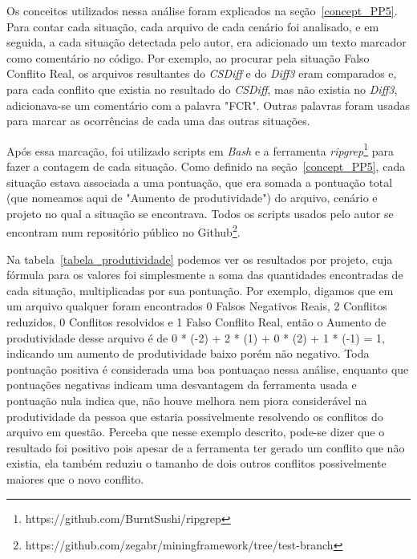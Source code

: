 Os conceitos utilizados nessa análise foram explicados na seção~\ref{concept_PP5}. Para contar cada situação, cada arquivo de cada
cenário foi analisado, e em seguida, a cada situação detectada pelo autor, era adicionado um texto marcador como comentário
no código. Por exemplo, ao procurar pela situação Falso Conflito Real, os arquivos resultantes do \emph{CSDiff} e do \emph{Diff3} eram comparados
e, para cada conflito que existia no resultado do \emph{CSDiff}, mas não existia no \emph{Diff3}, adicionava-se um comentário com a palavra "FCR".
Outras palavras foram usadas para marcar as ocorrências de cada uma das outras situações.

Após essa marcação, foi utilizado scripts em \emph{Bash} e a ferramenta \emph{ripgrep}\footnote{https://github.com/BurntSushi/ripgrep}
para fazer a contagem de cada situação. Como definido
na seção~\ref{concept_PP5}, cada situação estava associada a uma pontuação, que era somada
a pontuação total (que nomeamos aqui de "Aumento de produtividade") do arquivo, cenário e projeto no qual a situação
se encontrava. Todos os scripts usados pelo autor se encontram num repositório público no Github\footnote{https://github.com/zegabr/miningframework/tree/test-branch}. %

Na tabela~\ref{tabela_produtividade} podemos ver os resultados por projeto, cuja fórmula para os valores foi simplesmente a soma
das quantidades encontradas de cada situação, multiplicadas por sua pontuação. Por exemplo, digamos que em um arquivo qualquer
foram encontrados 0 Falsos Negativos Reais, 2 Conflitos reduzidos, 0 Conflitos resolvidos e 1 Falso Conflito Real, então o
Aumento de produtividade desse arquivo é de 0 * (-2) + 2 * (1) + 0 * (2) + 1 * (-1) = 1, indicando um aumento de
produtividade baixo porém não negativo. Toda pontuação positiva é considerada uma boa pontuaçao nessa análise, enquanto que
pontuações negativas indicam uma desvantagem da ferramenta usada e pontuação nula indica que, não houve melhora nem piora
considerável na produtividade da pessoa que estaria possivelmente resolvendo os conflitos do arquivo em questão.
Perceba que nesse exemplo descrito, pode-se dizer que o resultado foi positivo pois apesar de a ferramenta ter gerado um
conflito que não existia, ela também reduziu o tamanho de dois outros conflitos possivelmente maiores que o novo conflito.

